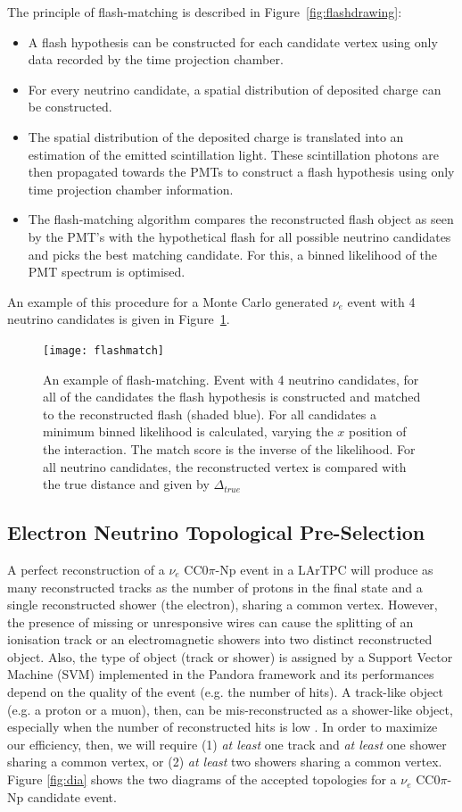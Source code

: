 The principle of flash-matching is described in Figure~\ref{fig:flashdrawing}:
\begin{itemize}
\item A flash hypothesis can be constructed for each candidate vertex using only data recorded by the time projection chamber.
\item For every neutrino candidate, a spatial distribution of deposited charge can be constructed.
\item The spatial distribution of the deposited charge is translated into an estimation of the emitted scintillation light. These scintillation photons are then propagated towards the PMTs to construct a flash hypothesis using only time projection chamber information.
\item The flash-matching algorithm compares the reconstructed flash object as seen by the PMT's with the hypothetical flash for all possible neutrino candidates and picks the best matching candidate. For this, a binned likelihood of the PMT spectrum is optimised.
\end{itemize}
An example of this procedure for a Monte Carlo generated $\nu_e$ event with 4 neutrino candidates is given in Figure~\ref{fig:flashmatch}.
\begin{figure}[!htbp]
\centering
\texttt{[image: flashmatch]} 
\caption{An example of flash-matching. Event with 4 neutrino candidates, for all of the candidates the flash hypothesis is constructed and matched to the reconstructed flash (shaded blue). For all candidates a minimum binned likelihood is calculated, varying the $x$ position of the interaction. The match score is the inverse of the likelihood. For all neutrino candidates, the reconstructed vertex is compared with the true distance and given by $\Delta_{true}$ } 
\label{fig:flashmatch}
\end{figure}

\subsection{Electron Neutrino Topological Pre-Selection}
A perfect reconstruction of a $\nu_{e}$ CC0$\pi$-Np event in a LArTPC will produce as many reconstructed tracks as the number of protons in the final state and a single reconstructed shower (the electron), sharing a common vertex. However, the presence of missing or unresponsive wires can cause the splitting of an ionisation track or an electromagnetic showers into two distinct reconstructed object. Also, the type of object (track or shower) is assigned by a Support Vector Machine (SVM) implemented in the Pandora framework and its performances depend on the quality of the event (e.g. the number of hits). A track-like object (e.g. a proton or a muon), then, can be mis-reconstructed as a shower-like object, especially when the number of reconstructed hits is low \cite{pandora2}. In order to maximize our efficiency, then, we will require (1) \emph{at least} one track and \emph{at least} one shower sharing a common vertex, or (2) \emph{at least} two showers sharing a common vertex. Figure \ref{fig:dia} shows the two diagrams of the accepted topologies for a $\nu_{e}$ CC0$\pi$-Np candidate event.

